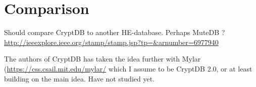 \chapter{Comparison}
\label{chp:comparison}

Should compare CryptDB to another HE-database. Perhaps MuteDB ? \url{http://ieeexplore.ieee.org/stamp/stamp.jsp?tp=&arnumber=6977940}


The authors of CryptDB has taken the idea further with Mylar (\url{https://css.csail.mit.edu/mylar/} which I assume to be CryptDB 2.0, or at least building on the main idea. Have not studied yet.